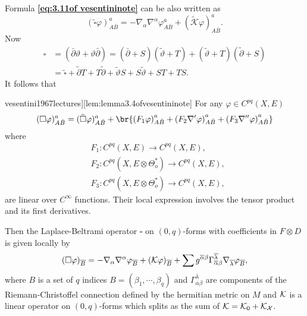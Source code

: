 \documentclass[lang=en,12pt]{beautybook}
\begin{document}
Formula \textbf{\eqref{eq:3.11of vesentininote}} can be also written as
\begin{equation}\label{eq:3.14of vesentininote}
(\tilde{\square} \varphi)_{A \bar{B}}^a=-\nabla_\alpha \nabla^\alpha \varphi_{A \bar{B}}^a+(\tilde{\mathcal{K}} \varphi)_{A \bar{B}}^a .
\end{equation}
Now
\begin{equation*}
\begin{aligned}
\square & =(\bar{\partial} \vartheta+\vartheta \bar{\partial})=(\bar{\partial}+S)(\tilde{\vartheta}+T)+(\tilde{\vartheta}+T)(\tilde{\partial}+S) \\
& =\tilde{\square}+\tilde{\partial} T+T \tilde{\partial}+\tilde{\vartheta} S+S \tilde{\vartheta}+S T+T S .
\end{aligned}
\end{equation*}
It follows that
\begin{lemma}[][\cite[Lemma 3.4.]{vesentini1967lectures}][lem:lemma3.4ofvesentininote]
  For any $\varphi \in C^{p q}(X, E)$
\begin{equation}\label{eq:local-expression-of-Beltrami-operator}
(\square \varphi)_{A \bar{B}}^a=(\tilde{\square} \varphi)_{A \bar{B}}^a+\br{\left(F_1 \varphi\right)_{A \bar{B}}^a+\left(F_2 \nabla^{\prime} \varphi\right)_{A \bar{B}}^a+\left(F_3 \nabla^{\prime \prime} \varphi\right)_{A \bar{B}}^a}
\end{equation}
where
\begin{equation*}
\begin{aligned}
& F_1: C^{p q}(X, E) \rightarrow C^{p q}(X, E), \\
& F_2: C^{p q}\left(X, E \otimes \Theta_o^*\right) \rightarrow C^{p q}(X, E), \\
& F_3: C^{p q}\left(X, E \otimes \Theta_o^*\right) \rightarrow C^{p q}(X, E),
\end{aligned}
\end{equation*}
are linear over $C^{\infty}$ functions. Their local expression involves the tensor product and its first derivatives.
\end{lemma}
Then the Laplace-Beltrami operator $\square$ on $(0,q)$-forms with coefficients in $F\otimes D$ is given locally by 
\begin{equation}
  \label{Local expression of Laplace-Beltrami operator}
  (\square\varphi)_{\overline{B}}=-\nabla_\alpha\nabla^\alpha\varphi_{\overline{B}}+({\mathcal K}\varphi)_{\overline{B}}+\sum g^{\overline{\alpha}\beta}\Gamma_{\overline{\alpha}\beta}^{\overline{\lambda}}\nabla_{\overline{\lambda}}\varphi_{\overline{B}},
\end{equation}
where $B$ is a set of $q$ indices $B=(\beta_1,\cdots,\beta_q)$ and $\Gamma_{\overline{\alpha}\beta}^{\overline{\lambda}}$ are components of the Riemann-Christoffel connection defined by the hermitian metric on $M$ and ${\mathcal K}$ is a linear operator on $(0,q)$-forms which splits as the sum of ${\mathcal K}={\mathcal K}_0+{\mathcal K}_{\mathcal X}$. 
\end{document}
